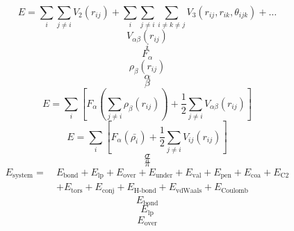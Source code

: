 \documentclass{scrreprt}
\begin{document}
\begin{equation}
  \label{eq:nbody-energy}
  E = \sum_i\sum_{j \neq i}{V_2\left(r_{ij}\right)} + \sum_i\sum_{j \neq i}\sum_{i \neq k \neq j}{V_3\left(r_{ij}, r_{ik}, \theta_{ijk}\right)} + \dots
\end{equation}
\begin{equation}
V_{\alpha\beta}(r_{ij})
\end{equation}
\begin{equation}
i
\end{equation}
\begin{equation}
F_\alpha
\end{equation}
\begin{equation}
\rho_\beta(r_{ij})
\end{equation}
\begin{equation}
\alpha
\end{equation}
\begin{equation}
\beta
\end{equation}
\begin{equation}
  \label{eq:eam-energy}
  E = \sum_i\left[F_\alpha\left(\sum_{j\neq i}{\rho_\beta\left(r_{ij}\right)}\right) + \frac{1}{2}\sum_{j\neq i}{V_{\alpha\beta}\left(r_{ij}\right)}\right]
\end{equation}
\begin{equation}
  \label{eq:meam-energy}
  E = \sum_i\left[F_\alpha\left(\bar{\rho_i}\right) + \frac{1}{2}\sum_{j\neq i}{V_{ij}\left(r_{ij}\right)}\right]
\end{equation}
\begin{equation}
\sigma
\end{equation}
\begin{equation}
\pi
\end{equation}
\begin{equation}
\pi
\end{equation}
\begin{align}
  \label{eq:reaxformulation}
  E_\text{system} =~& E_\text{bond} + E_\text{lp} + E_\text{over} + E_\text{under} + E_\text{val} + E_\text{pen} + E_\text{coa} + E_\text{C2} \\
  \nonumber  & + E_\text{tors} + E_\text{conj} + E_\text{H-bond} + E_\text{vdWaals} + E_\text{Coulomb}
\end{align}
\begin{equation}
E_\text{bond}
\end{equation}
\begin{equation}
E_\text{lp}
\end{equation}
\begin{equation}
E_\text{over}
\end{equation}
\end{document}
